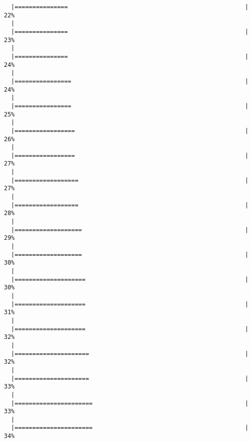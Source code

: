 \begin{knitrout}
\begin{kframe}
\begin{verbatim}
  |===============                                                  |  22%
  |                                                                       
  |===============                                                  |  23%
  |                                                                       
  |===============                                                  |  24%
  |                                                                       
  |================                                                 |  24%
  |                                                                       
  |================                                                 |  25%
  |                                                                       
  |=================                                                |  26%
  |                                                                       
  |=================                                                |  27%
  |                                                                       
  |==================                                               |  27%
  |                                                                       
  |==================                                               |  28%
  |                                                                       
  |===================                                              |  29%
  |                                                                       
  |===================                                              |  30%
  |                                                                       
  |====================                                             |  30%
  |                                                                       
  |====================                                             |  31%
  |                                                                       
  |====================                                             |  32%
  |                                                                       
  |=====================                                            |  32%
  |                                                                       
  |=====================                                            |  33%
  |                                                                       
  |======================                                           |  33%
  |                                                                       
  |======================                                           |  34%

\end{verbatim}
\end{kframe}
\end{knitrout}
